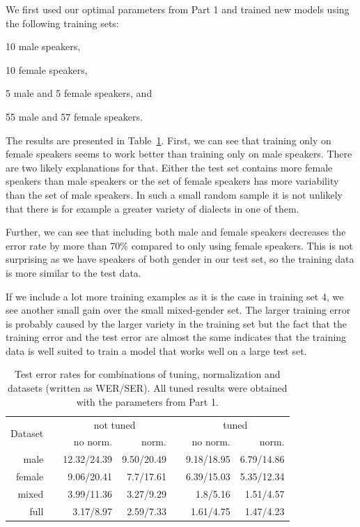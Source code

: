 \documentclass[twocolumn, 11pt]{article}
\begin{document}
We first used our optimal parameters from Part 1 and trained new models using
the following training sets:
\begin{inparaenum}[1)]
  \item 10 male speakers,
  \item 10 female speakers,
  \item 5 male and 5 female speakers, and
  \item 55 male and 57 female speakers.
\end{inparaenum}

The results are presented in Table~\ref{tab:wer-comb}\@. First, we can see that training only
on female speakers seems to work better than training only on male speakers.
There are two likely explanations for that. Either the test set contains
more female speakers than male speakers or the set of female speakers has more
variability than the set of male speakers. In such a small random sample it is
not unlikely that there is for example a greater variety of dialects in one of them.

Further, we can see that including both male and female speakers decreases the
error rate by more than 70\% compared to only using female speakers. This is not
surprising as we have speakers of both gender in our test set, so the training
data is more similar to the test data.

If we include a lot more training examples as it is the case in training set 4,
we see another small gain over the small mixed-gender set. The larger training
error is probably caused by the larger variety in the training set but the fact
that the training error and the test error are almost the same indicates that
the training data is well suited to train a model that works well on a large
test set.

\begin{table}\centering
  \begin{tabular}{@{}rcrrcrr@{}}\toprule%
    \multirow{2}{*}{Dataset} & \phantom{a} & \multicolumn{2}{c}{not tuned}
    & \phantom{a} & \multicolumn{2}{c}{tuned}\\
    \cmidrule{3-4} \cmidrule{6-7}
    && no norm. & norm. && no norm. & norm.\\ \midrule%
    male && 12.32/24.39 & 9.50/20.49 && 9.18/18.95 & 6.79/14.86\\
    female && 9.06/20.41 & 7.7/17.61 && 6.39/15.03 & 5.35/12.34\\
    mixed && 3.99/11.36 & 3.27/9.29 && 1.8/5.16 & 1.51/4.57\\
    full && 3.17/8.97 & 2.59/7.33 && 1.61/4.75 & 1.47/4.23\\
  \end{tabular}
  \caption{Test error rates for combinations of tuning, normalization and
  datasets (written as WER/SER). All tuned results were obtained with the parameters from Part 1.}\label{tab:wer-comb}
\end{table}
\end{document}
